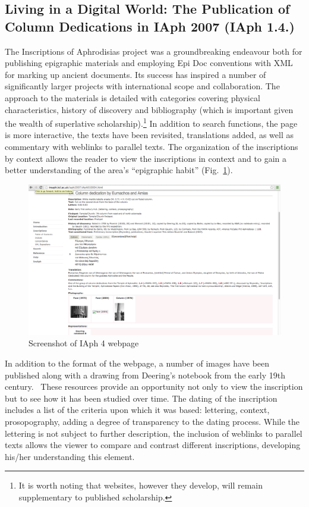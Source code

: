 \documentclass[amsthm,ebook]{saparticle}
\begin{document}
\subsection{Living in a Digital World: The Publication of Column Dedications in IAph 2007 (IAph 1.4.)}
The Inscriptions of Aphrodisias project was a groundbreaking endeavour both for publishing epigraphic materials and
employing Epi Doc conventions with XML for marking up ancient documents. Its success has inspired a number of
significantly larger projects with international scope and collaboration. The approach to the materials is detailed
with categories covering physical characteristics, history of discovery and bibliography (which is important given the
wealth of superlative scholarship).\footnote{ It is worth noting that websites, however they develop, will remain
supplementary to published scholarship.} In addition to search functions, the page is more interactive, the texts
have been revisited, translations added, as well as commentary with weblinks to parallel texts. The organization of the
inscriptions by context allows the reader to view the inscriptions in context and to gain a better understanding of the
area’s ``epigraphic habit'' (Fig.~\ref{fig:1}).




\begin{figure}[!bp]
\centering
 \includegraphics[width=\columnwidth]{PaperproposalforEAGLEfinal-img001.png}
\caption{Screenshot of IAph 4 webpage}
\label{fig:1}
\end{figure}


In addition to the format of the webpage, a number of images have been published along with a drawing from Deering’s
notebook from the early 19th century. \ These resources provide an opportunity not only to view the inscription but to
see how it has been studied over time. The dating of the inscription includes a list of the criteria upon which it was
based: lettering, context, prosopography, adding a degree of transparency to the dating process. While the lettering is
not subject to further description, the inclusion of weblinks to parallel texts allows the viewer to compare and
contrast different inscriptions, developing his/her understanding this element. 
\end{document}
